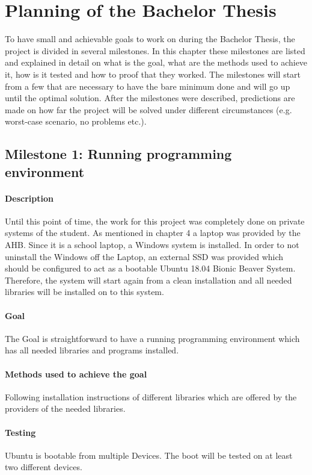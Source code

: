 \chapter{Planning of the Bachelor Thesis}
\label{chap:planning}

To have small and achievable goals to work on during the Bachelor Thesis, the project is divided in several milestones. In this chapter these milestones are listed and explained in detail on what is the goal, what are the methods used to achieve it, how is it tested and how to proof that they worked. The milestones will start from a few that are necessary to have the bare minimum done and will go up until the optimal solution. After the milestones were described, predictions are made on how far the project will be solved under different circumstances (e.g. worst-case scenario, no problems etc.).

\section{Milestone 1: Running programming environment}
\label{chap:mile1}
\subsubsection{Description}
Until this point of time, the work for this project was completely done on private systems of the student. As mentioned in chapter 4 a laptop was provided by the AHB. Since it is a school laptop, a Windows system is installed. In order to not uninstall the Windows off the Laptop, an external SSD was provided which should be configured to act as a bootable Ubuntu 18.04 Bionic Beaver System. Therefore, the system will start again from a clean installation and all needed libraries will be installed on to this system.
\subsubsection{Goal}
The Goal is straightforward to have a running programming environment which has all needed libraries and programs installed.
\subsubsection{Methods used to achieve the goal}
Following installation instructions of different libraries which are offered by the providers of the needed libraries.
\subsubsection{Testing}
Ubuntu is bootable from multiple Devices.
The boot will be tested on at least two different devices. 
